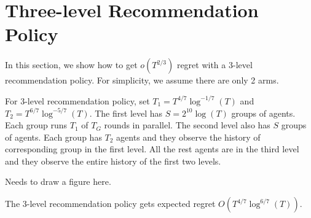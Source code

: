 
\section{Three-level Recommendation Policy}
In this section, we show how to get $o(T^{2/3})$ regret with a 3-level recommendation policy. For simplicity, we assume there are only 2 arms.

For 3-level recommendation policy, set $T_1 = T^{4/7}\log^{-1/7}(T)$ and $T_2 = T^{6/7}\log^{-5/7}(T)$. The first level has $S = 2^10\log(T)$ groups of agents. Each group runs $T_1$ \ALGG of $T_G$ rounds in parallel. The second level also has $S$ groups of agents. Each group has $T_2$ agents and they observe the history of corresponding group in the first level. All the rest agents are in the third level and they observe the entire history of the first two levels. 

Needs to draw a figure here.

\begin{theorem}
The 3-level recommendation policy gets expected regret $O(T^{4/7} \log^{6/7}(T))$. 
\end{theorem}

